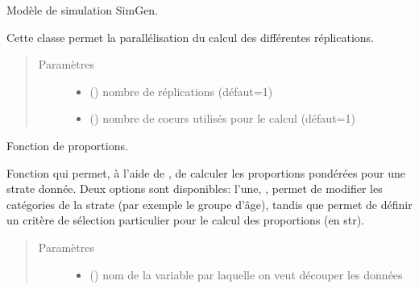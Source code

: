\documentclass[letterpaper,10pt,french]{sphinxmanual}
\begin{document}

\begin{fulllineitems}
\label{\detokenize{utilisation:id8}}
Modèle de simulation SimGen.

Cette classe permet la parallélisation du calcul des différentes réplications.
\begin{quote}\begin{description}
\item[{Paramètres}] \leavevmode\begin{itemize}
\item {} 
 () \textendash{} nombre de réplications (défaut=1)

\item {} 
 () \textendash{} nombre de coeurs utilisés pour le calcul (défaut=1)

\end{itemize}

\end{description}\end{quote}

\begin{fulllineitems}
\label{\detokenize{utilisation:simgen.replicate.prop}}
Fonction de proportions.

Fonction qui permet, à l’aide de , de calculer les proportions pondérées pour une strate donnée. Deux options sont disponibles: l’une, , permet de modifier les catégories de la strate (par exemple le groupe d’âge), tandis que  permet de définir un critère de sélection particulier pour le calcul des proportions (en str).
\begin{quote}\begin{description}
\item[{Paramètres}] \leavevmode\begin{itemize}
\item {} 
 () \textendash{} nom de la variable par laquelle on veut découper les données


\end{itemize}
\end{description}
\end{quote}
\end{fulllineitems}
\end{fulllineitems}
\end{document}
